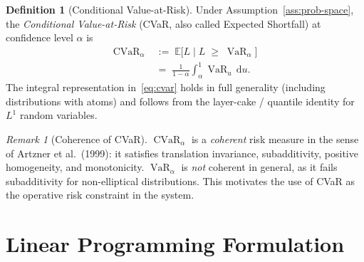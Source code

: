 \documentclass[12pt,openany]{book}
\newcommand{\E}{\mathbb{E}}
\numberwithin{equation}{chapter}
\theoremstyle{plain}
\theoremstyle{definition}
\newtheorem{definition}[theorem]{Definition}
\theoremstyle{remark}
\newtheorem{remark}[theorem]{Remark}
\numberwithin{equation}{chapter}
\theoremstyle{plain}
\DeclareMathOperator{\CVaR}{CVaR}
\DeclareMathOperator{\VaR}{VaR}
\begin{document}
\begin{definition}[Conditional Value-at-Risk]
\label{def:cvar}
Under Assumption~\ref{ass:prob-space}, the \emph{Conditional
Value-at-Risk} (CVaR, also called Expected Shortfall) at confidence
level $\alpha$ is
\begin{align}
  \CVaR_\alpha
    &\;:=\; \E\!\bigl[L \;\big|\; L \;\geq\; \VaR_\alpha\bigr]
            \label{eq:cvar-cond} \\[4pt]
    &\;=\;  \frac{1}{1-\alpha}
            \int_{\alpha}^{1} \VaR_u \,\mathrm{d}u.
            \label{eq:cvar}
\end{align}
The integral representation in~\eqref{eq:cvar} holds in full
generality (including distributions with atoms) and follows from the
layer-cake / quantile identity for $L^1$ random variables.
\end{definition}

\begin{remark}[Coherence of CVaR]
\label{rem:cvar-coherent}
$\CVaR_\alpha$ is a \emph{coherent} risk measure in the sense of
Artzner et al.\ (1999): it satisfies translation invariance,
subadditivity, positive homogeneity, and monotonicity.
$\VaR_\alpha$ is \emph{not} coherent in general, as it fails
subadditivity for non-elliptical distributions.  This motivates
the use of CVaR as the operative risk constraint in the system.
\end{remark}

\section{Linear Programming Formulation}
\end{document}
